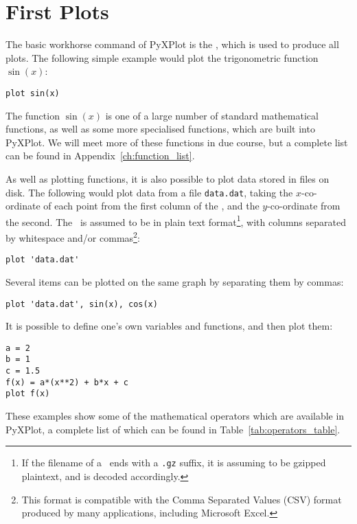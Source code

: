 \section{First Plots}
\label{sec:first_plots}

The basic workhorse command of PyXPlot is the , which is used to
produce all plots. The following simple example would plot the trigonometric
function $\sin(x)$:

\begin{verbatim}
plot sin(x)
\end{verbatim}

\noindent The function $\sin(x)$ is one of a large number of standard
mathematical functions, as well as some more specialised functions, which are
built into PyXPlot. We will meet more of these functions in due course, but a
complete list can be found in Appendix~\ref{ch:function_list}.

As well as plotting functions, it is also possible to plot data stored in files
on disk. The following would plot data from a file {\tt data.dat}, taking the
$x$-co-ordinate of each point from the first column of the \datafile, and the
$y$-co-ordinate from the second.  The \datafile\ is assumed to be in plain text
format\footnote{If the filename of a \datafile\ ends with a {\tt .gz} suffix,
it is assuming to be gzipped plaintext, and is decoded accordingly.}, with
columns separated by whitespace and/or commas\footnote{This format is
compatible with the Comma Separated Values (CSV) format produced by many
applications, including Microsoft Excel.}:

\begin{verbatim}
plot 'data.dat'
\end{verbatim}

Several items can be plotted on the same graph by separating them by commas:

\begin{verbatim}
plot 'data.dat', sin(x), cos(x)
\end{verbatim}

\noindent It is possible to define one's own variables and functions, and then
plot them:

\begin{verbatim}
a = 2
b = 1
c = 1.5
f(x) = a*(x**2) + b*x + c
plot f(x)
\end{verbatim}

These examples show some of the mathematical operators which are available in
PyXPlot, a complete list of which can be found in
Table~\ref{tab:operators_table}.

